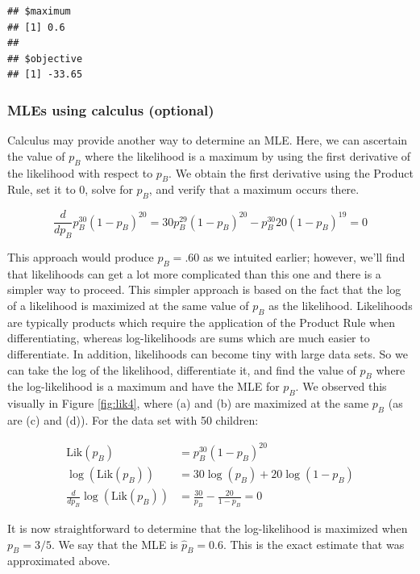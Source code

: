 \documentclass[
]{krantz}
\newcommand{\lik}{\mathrm{Lik}}
\begin{document}
\begin{verbatim}
## $maximum
## [1] 0.6
## 
## $objective
## [1] -33.65
\end{verbatim}

\subsubsection{MLEs using calculus (optional)}\label{calc-sec}

Calculus may provide another way to determine an MLE. Here, we can ascertain the value of \(p_B\) where the likelihood is a maximum by using the first derivative of the likelihood with respect to \(p_B\). We obtain the first derivative using the Product Rule, set it to 0, solve for \(p_B\), and verify that a maximum occurs there.

\begin{equation*}
\frac{d}{dp_B}p_B^{30}(1-p_B)^{20} = 30p_B^{29}(1-p_B)^{20}-p^{30}_B20(1-p_B)^{19} = 0
\end{equation*}

This approach would produce \(p_B = .60\) as we intuited earlier; however, we'll find that likelihoods can get a lot more complicated than this one and there is a simpler way to proceed. This simpler approach is based on the fact that the log of a likelihood is maximized at the same value of \(p_B\) as the likelihood. Likelihoods are typically products which require the application of the Product Rule when differentiating, whereas log-likelihoods are sums which are much easier to differentiate. In addition, likelihoods can become tiny with large data sets. So we can take the log of the likelihood, differentiate it, and find the value of \(p_B\) where the log-likelihood is a maximum and have the MLE for \(p_B\). We observed this visually in Figure \ref{fig:lik4}, where (a) and (b) are maximized at the same \(p_B\) (as are (c) and (d)). For the data set with 50 children:

\begin{align*}
 \lik(p_B)                      &= p_B^{30}(1-p_B)^{20} \\
 \log(\lik(p_B))                &= 30\log(p_B)+20\log(1-p_B) \\
 \frac{d}{dp_B} \log(\lik(p_B)) &= \frac{30}{p_B} - \frac{20}{1-p_B} = 0
 \label{eq:dlogLik50}
\end{align*}

It is now straightforward to determine that the log-likelihood is maximized when \(p_B = 3/5.\) We say that the MLE is \(\hat{p}_B = 0.6\). This is the exact estimate that was approximated above.
\end{document}
